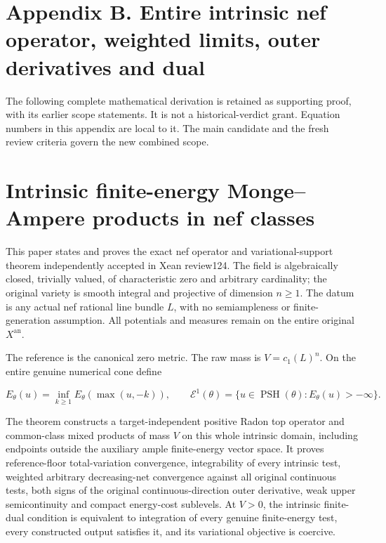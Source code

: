 \documentclass[
  10pt,
]{article}
\begin{document}
\section{Appendix B. Entire intrinsic nef operator, weighted limits,
outer derivatives and
dual}\label{appendix-b.-entire-intrinsic-nef-operator-weighted-limits-outer-derivatives-and-dual}

The following complete mathematical derivation is retained as supporting
proof, with its earlier scope statements. It is not a historical-verdict
grant. Equation numbers in this appendix are local to it. The main
candidate and the fresh review criteria govern the new combined scope.

\section{Intrinsic finite-energy Monge--Ampere products in nef
classes}\label{intrinsic-finite-energy-mongeampere-products-in-nef-classes}

This paper states and proves the exact nef operator and
variational-support theorem independently accepted in Xean review124.
The field is algebraically closed, trivially valued, of characteristic
zero and arbitrary cardinality; the original variety is smooth integral
and projective of dimension \(n\geq1\). The datum is any actual nef
rational line bundle \(L\), with no semiampleness or finite-generation
assumption. All potentials and measures remain on the entire original
\(X^{\mathrm{an}}\).

The reference is the canonical zero metric. The raw mass is
\(V=c_1(L)^n\). On the entire genuine numerical cone define

\[E_\theta(u)=\inf_{k\geq1}E_\theta(\max(u,-k)),\qquad
\mathcal E^1(\theta)=\{u\in\operatorname{PSH}(\theta):E_\theta(u)>-\infty\}.\]

The theorem constructs a target-independent positive Radon top operator
and common-class mixed products of mass \(V\) on this whole intrinsic
domain, including endpoints outside the auxiliary ample finite-energy
vector space. It proves reference-floor total-variation convergence,
integrability of every intrinsic test, weighted arbitrary decreasing-net
convergence against all original continuous tests, both signs of the
original continuous-direction outer derivative, weak upper
semicontinuity and compact energy-cost sublevels. At \(V>0\), the
intrinsic finite-dual condition is equivalent to integration of every
genuine finite-energy test, every constructed output satisfies it, and
its variational objective is coercive.
\end{document}
